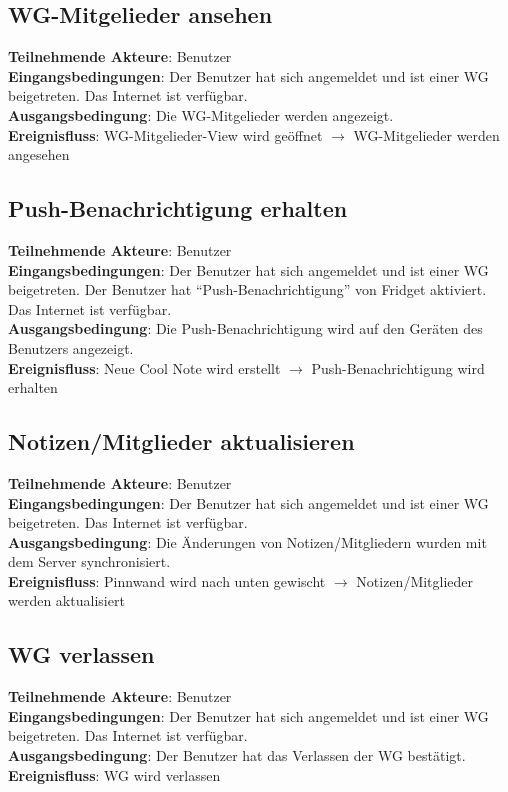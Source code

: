 \documentclass[a4paper]{scrreprt}
\begin{document}
        	\subsection{WG-Mitgelieder ansehen}
        	\textbf{Teilnehmende Akteure}: Benutzer \\
        	\textbf{Eingangsbedingungen}: Der Benutzer hat sich angemeldet und ist einer WG beigetreten. Das Internet ist verfügbar. \\
        	\textbf{Ausgangsbedingung}: Die WG-Mitgelieder werden angezeigt. \\
        	\textbf{Ereignisfluss}: WG-Mitgelieder-View wird geöffnet $\rightarrow$ WG-Mitgelieder werden angesehen
        	
        	\subsection{Push-Benachrichtigung erhalten}
        	\textbf{Teilnehmende Akteure}: Benutzer \\
        	\textbf{Eingangsbedingungen}: Der Benutzer hat sich angemeldet und ist einer WG beigetreten. Der Benutzer hat ``Push-Benachrichtigung'' von Fridget aktiviert. Das Internet ist verfügbar. \\
        	\textbf{Ausgangsbedingung}: Die Push-Benachrichtigung wird auf den Geräten des Benutzers angezeigt. \\
        	\textbf{Ereignisfluss}: Neue Cool Note wird erstellt $\rightarrow$ Push-Benachrichtigung wird erhalten
        	
        	\subsection{Notizen/Mitglieder aktualisieren}
        	\textbf{Teilnehmende Akteure}: Benutzer \\
        	\textbf{Eingangsbedingungen}: Der Benutzer hat sich angemeldet und ist einer WG beigetreten. Das Internet ist verfügbar. \\
        	\textbf{Ausgangsbedingung}: Die Änderungen von Notizen/Mitgliedern wurden mit dem Server synchronisiert. \\
        	\textbf{Ereignisfluss}: Pinnwand wird nach unten gewischt $\rightarrow$ Notizen/Mitglieder werden aktualisiert
        	
        	\subsection{WG verlassen}
        	\textbf{Teilnehmende Akteure}: Benutzer \\
        	\textbf{Eingangsbedingungen}: Der Benutzer hat sich angemeldet und ist einer WG beigetreten. Das Internet ist verfügbar. \\
        	\textbf{Ausgangsbedingung}: Der Benutzer hat das Verlassen der WG bestätigt. \\
        	\textbf{Ereignisfluss}: WG wird verlassen
        	
\end{document}
